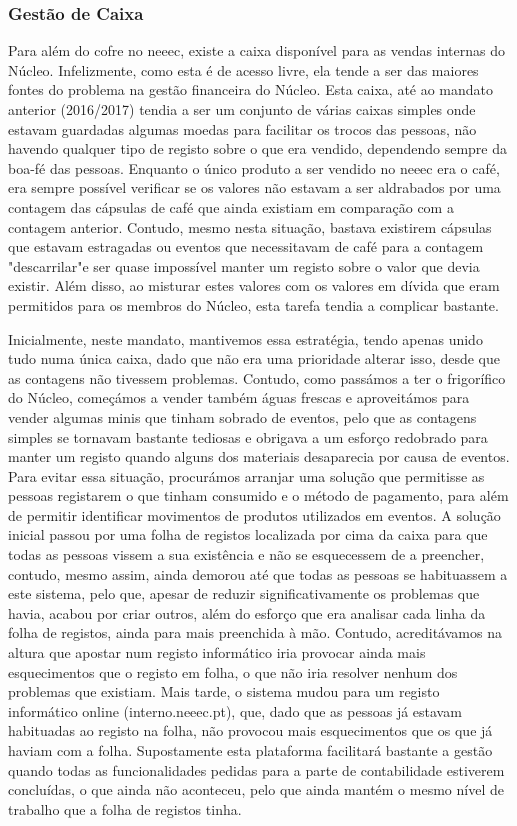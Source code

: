 
\subsubsection{Gestão de Caixa}

Para além do cofre no \acrshort{neeec}, existe a caixa disponível para as vendas internas do Núcleo. Infelizmente, como esta é de acesso livre, ela tende a ser das maiores fontes do problema na gestão financeira do Núcleo. Esta caixa, até ao mandato anterior (2016/2017) tendia a ser um conjunto de várias caixas simples onde estavam guardadas algumas moedas para facilitar os trocos das pessoas, não havendo qualquer tipo de registo sobre o que era vendido, dependendo sempre da boa-fé das pessoas. Enquanto o único produto a ser vendido no \acrshort{neeec} era o café, era sempre possível verificar se os valores não estavam a ser aldrabados por uma contagem das cápsulas de café que ainda existiam em comparação com a contagem anterior. Contudo, mesmo nesta situação, bastava existirem cápsulas que estavam estragadas ou eventos que necessitavam de café para a contagem "descarrilar"\space e ser quase impossível manter um registo sobre o valor que devia existir. Além disso, ao misturar estes valores com os valores em dívida que eram permitidos para os membros do Núcleo, esta tarefa tendia a complicar bastante.

Inicialmente, neste mandato, mantivemos essa estratégia, tendo apenas unido tudo numa única caixa, dado que não era uma prioridade alterar isso, desde que as contagens não tivessem problemas. Contudo, como passámos a ter o frigorífico do Núcleo, começámos a vender também águas frescas e aproveitámos para vender algumas minis que tinham sobrado de eventos, pelo que as contagens simples se tornavam bastante tediosas e obrigava a um esforço redobrado para manter um registo quando alguns dos materiais desaparecia por causa de eventos. Para evitar essa situação, procurámos arranjar uma solução que permitisse as pessoas registarem o que tinham consumido e o método de pagamento, para além de permitir identificar movimentos de produtos utilizados em eventos. A solução inicial passou por uma folha de registos localizada por cima da caixa para que todas as pessoas vissem a sua existência e não se esquecessem de a preencher, contudo, mesmo assim, ainda demorou até que todas as pessoas se habituassem a este sistema, pelo que, apesar de reduzir significativamente os problemas que havia, acabou por criar outros, além do esforço que era analisar cada linha da folha de registos, ainda para mais preenchida à mão. Contudo, acreditávamos na altura que apostar num registo informático iria provocar ainda mais esquecimentos que o registo em folha, o que não iria resolver nenhum dos problemas que existiam. Mais tarde, o sistema mudou para um registo informático online (interno.neeec.pt), que, dado que as pessoas já estavam habituadas ao registo na folha, não provocou mais esquecimentos que os que já haviam com a folha. Supostamente esta plataforma facilitará bastante a gestão quando todas as funcionalidades pedidas para a parte de contabilidade estiverem concluídas, o que ainda não aconteceu, pelo que ainda mantém o mesmo nível de trabalho que a folha de registos tinha.